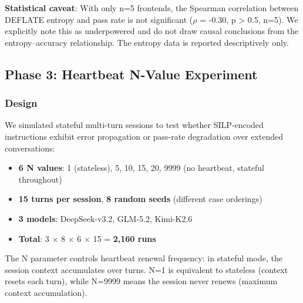 \documentclass{article}
\begin{document}
\textbf{Statistical caveat}: With only n=5 frontends, the Spearman correlation between DEFLATE entropy and pass rate is not significant ($\rho$ = -0.30, p > 0.5, n=5). We explicitly note this as underpowered and do not draw causal conclusions from the entropy--accuracy relationship. The entropy data is reported descriptively only.



\subsection{Phase 3: Heartbeat N-Value Experiment}\label{phase-3-heartbeat-n-value-experiment}



\subsubsection{Design}\label{design-1}



We simulated stateful multi-turn sessions to test whether SILP-encoded instructions exhibit error propagation or pass-rate degradation over extended conversations:



\begin{itemize}



\item

  \textbf{6 N values}: 1 (stateless), 5, 10, 15, 20, 9999 (no heartbeat, stateful throughout)

\item

  \textbf{15 turns per session}, \textbf{8 random seeds} (different case orderings)

\item

  \textbf{3 models}: DeepSeek-v3.2, GLM-5.2, Kimi-K2.6

\item

  \textbf{Total}: 3 $\times$ 8 $\times$ 6 $\times$ 15 = \textbf{2,160 runs}

\end{itemize}



The N parameter controls heartbeat renewal frequency: in stateful mode, the session context accumulates over turns. N=1 is equivalent to stateless (context resets each turn), while N=9999 means the session never renews (maximum context accumulation).
\end{document}
